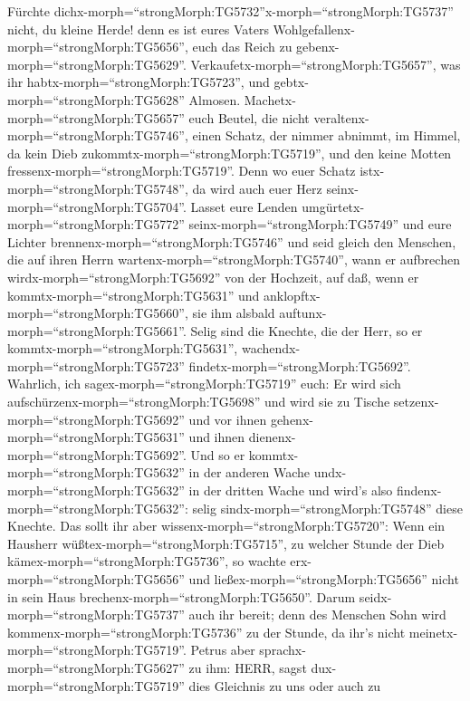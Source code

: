 Fürchte
dichx-morph=``strongMorph:TG5732''\textbar x-morph=``strongMorph:TG5737''
nicht, du kleine Herde! denn es ist eures Vaters
Wohlgefallenx-morph=``strongMorph:TG5656'', euch das Reich zu
gebenx-morph=``strongMorph:TG5629''. 
Verkaufetx-morph=``strongMorph:TG5657'', was ihr
habtx-morph=``strongMorph:TG5723'', und
gebtx-morph=``strongMorph:TG5628'' Almosen.
Machetx-morph=``strongMorph:TG5657'' euch Beutel, die nicht
veraltenx-morph=``strongMorph:TG5746'', einen Schatz, der nimmer
abnimmt, im Himmel, da kein Dieb zukommtx-morph=``strongMorph:TG5719'',
und den keine Motten fressenx-morph=``strongMorph:TG5719''.
 Denn wo euer Schatz istx-morph=``strongMorph:TG5748'', da
wird auch euer Herz seinx-morph=``strongMorph:TG5704''. 
Lasset eure Lenden umgürtetx-morph=``strongMorph:TG5772''
seinx-morph=``strongMorph:TG5749'' und eure Lichter
brennenx-morph=``strongMorph:TG5746''  und seid gleich den
Menschen, die auf ihren Herrn wartenx-morph=``strongMorph:TG5740'', wann
er aufbrechen wirdx-morph=``strongMorph:TG5692'' von der Hochzeit, auf
daß, wenn er kommtx-morph=``strongMorph:TG5631'' und
anklopftx-morph=``strongMorph:TG5660'', sie ihm alsbald
auftunx-morph=``strongMorph:TG5661''.  Selig sind die
Knechte, die der Herr, so er kommtx-morph=``strongMorph:TG5631'',
wachendx-morph=``strongMorph:TG5723''
findetx-morph=``strongMorph:TG5692''. Wahrlich, ich
sagex-morph=``strongMorph:TG5719'' euch: Er wird sich
aufschürzenx-morph=``strongMorph:TG5698'' und wird sie zu Tische
setzenx-morph=``strongMorph:TG5692'' und vor ihnen
gehenx-morph=``strongMorph:TG5631'' und ihnen
dienenx-morph=``strongMorph:TG5692''.  Und so er
kommtx-morph=``strongMorph:TG5632'' in der anderen Wache
undx-morph=``strongMorph:TG5632'' in der dritten Wache und wird's also
findenx-morph=``strongMorph:TG5632'': selig
sindx-morph=``strongMorph:TG5748'' diese Knechte.  Das
sollt ihr aber wissenx-morph=``strongMorph:TG5720'': Wenn ein Hausherr
wüßtex-morph=``strongMorph:TG5715'', zu welcher Stunde der Dieb
kämex-morph=``strongMorph:TG5736'', so wachte
erx-morph=``strongMorph:TG5656'' und ließex-morph=``strongMorph:TG5656''
nicht in sein Haus brechenx-morph=``strongMorph:TG5650''. 
Darum seidx-morph=``strongMorph:TG5737'' auch ihr bereit; denn des
Menschen Sohn wird kommenx-morph=``strongMorph:TG5736'' zu der Stunde,
da ihr's nicht meinetx-morph=``strongMorph:TG5719''. 
Petrus aber sprachx-morph=``strongMorph:TG5627'' zu ihm: HERR, sagst
dux-morph=``strongMorph:TG5719'' dies Gleichnis zu uns oder auch zu
